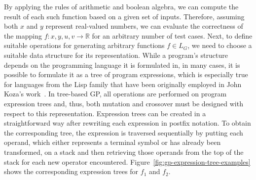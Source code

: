 By applying the rules of arithmetic and boolean algebra, we can compute the result of each such function based on a given set of inputs.
Therefore, assuming both $x$ and $y$ represent real-valued numbers, we can evaluate the correctness of the mapping $f : x, y, u, v \to \mathbb{R}$ for an arbitrary number of test cases.
Next, to define suitable operations for generating arbitrary functions $f \in L_G$, we need to choose a suitable data structure for its representation.
While a program's structure depends on the programming language it is formulated in, in many cases, it is possible to formulate it as a tree of program expressions, which is especially true for languages from the Lisp family that have been originally employed in John Koza's work~\cite{koza1994genetic}.
In tree-based GP, all operations are performed on program expression trees and, thus, both mutation and crossover must be designed with respect to this representation.
Expression trees can be created in a straightforward way after rewriting each expression in postfix notation. 
To obtain the corresponding tree, the expression is traversed sequentially by putting each operand, which either represents a terminal symbol or has already been transformed, on a stack and then retrieving those operands from the top of the stack for each new operator encountered.
Figure~\ref{fig:gp-expression-tree-examples} shows the corresponding expression trees for $f_1$ and $f_2$.
